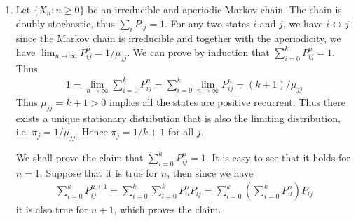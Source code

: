 \documentclass[a4paper,10pt]{article}
\theoremstyle{definition}
\begin{document}
\begin{enumerate}


\item Let $\{X_n:n\geq 0\}$ be an irreducible and aperiodic Markov chain. The chain is doubly stochastic, thus $\sum_{i}P_{ij}=1$. For any two states $i$ and $j$, we have $i \leftrightarrow j$ since the Markov chain is irreducible and together with the aperiodicity, we have $\lim_{n\to\infty}P_{ij}^n=1/\mu_{jj}$. We can prove by induction that $\sum^{k}_{i=0}P^n_{ij}=1$. Thus
\begin{align*}
1 = \lim_{n\to\infty}\sum_{i=0}^{k}P^n_{ij}=\sum_{i=0}^{k}\lim_{n\to\infty}P^n_{ij}=(k+1)/\mu_{jj}
\end{align*}
Thus $\mu_{jj}=k+1>0$ implies all the states are positive recurrent. Thus there exists a unique stationary distribution that is also the limiting distribution, i.e. $\pi_j = 1/\mu_{jj}$. Hence $\pi_j = 1/k+1$ for all $j$.

We shall prove the claim that $\sum^{k}_{i=0}P^n_{ij}=1$. It is easy to see that it holds for $n=1$. Suppose that it is true for $n$, then since we have
\begin{align*}
\sum^{k}_{i=0}P^{n+1}_{ij} = \sum^{k}_{i=0}\sum_{l=0}^{k}P^{n}_{il}P_{lj}= \sum_{l=0}^{k}\left(\sum^{k}_{i=0}P^{n}_{il}\right)P_{lj}
\end{align*}
it is also true for $n+1$, which proves the claim.






\end{enumerate}
\end{document}
